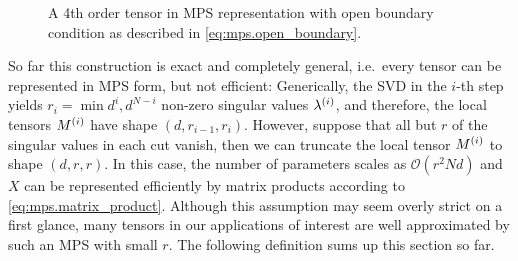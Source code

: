 \begin{figure*}
  \centering
  \caption{%
    \label{fig:mps.mps}
    A 4th order tensor in MPS representation with open boundary condition as described in \cref{eq:mps.open_boundary}.
  }
\end{figure*}

So far this construction is exact and completely general, i.e.\ every tensor can be represented in MPS form, but not efficient:
Generically, the SVD in the $i$-th step yields $r_i = \min{d^i, d^{N - i}}$ non-zero singular values $\lambda^{(i)}$, and therefore, the local tensors $M^{(i)}$ have shape $(d, r_{i-1}, r_i)$.
However, suppose that all but $r$ of the singular values in each cut vanish, then we can truncate the local tensor $M^{(i)}$ to shape $(d, r, r)$.
In this case, the number of parameters scales as $\mathcal{O}(r^2 N d)$ and $X$ can be represented efficiently by matrix products according to \cref{eq:mps.matrix_product}.
Although this assumption may seem overly strict on a first glance, many tensors in our applications of interest are well approximated by such an MPS with small $r$.
The following definition sums up this section so far.

